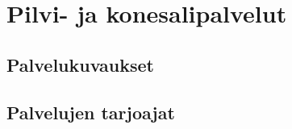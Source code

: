 \chapter{Pilvi- ja konesalipalvelut\label{konesalipalvelut}}

\section{Palvelukuvaukset}
\section{Palvelujen tarjoajat}